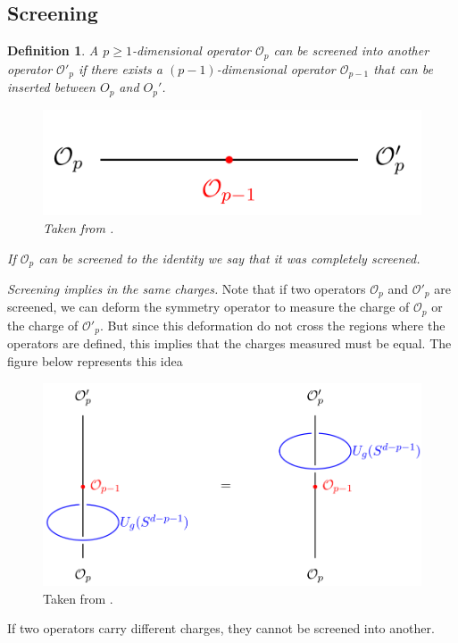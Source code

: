 \documentclass{article}
\newtheorem{definition}{Definition}
\begin{document}
\subsection{Screening}
\begin{definition}
	A $p\geq 1$-dimensional operator $\mathcal{O}_p$ can be screened into another operator $\mathcal{O}'_p$ if there exists a $(p-1)$-dimensional operator $\mathcal{O}_{p-1}$ that can be inserted between $O_p$ and $O_p'$. 
	\begin{figure}[H]
		\centering
		\includegraphics[scale=0.4]{figures/screening.png}
		\caption{Taken from \cite{Bhardwaj}.}
	\end{figure}
\noindent If $\mathcal{O}_p$ can be screened to the identity we say that it was completely screened. 
\end{definition}
\textit{Screening implies in the same charges.} Note that if two operators $\mathcal{O}_p$ and $\mathcal{O}'_p$ are screened, we can deform the symmetry operator to measure the charge of $\mathcal{O}_p$ or the charge of  $\mathcal{O}'_p$. But since this deformation do not cross the regions where the operators are defined, this implies that the charges measured must be equal. The figure below represents this idea
\begin{figure}[H]
	\centering
	\includegraphics[scale=0.3]{figures/screening2.png}
	\caption{Taken from \cite{Bhardwaj}.}
\end{figure} 
\noindent If two operators carry different charges, they cannot be screened into another. 
\end{document}
